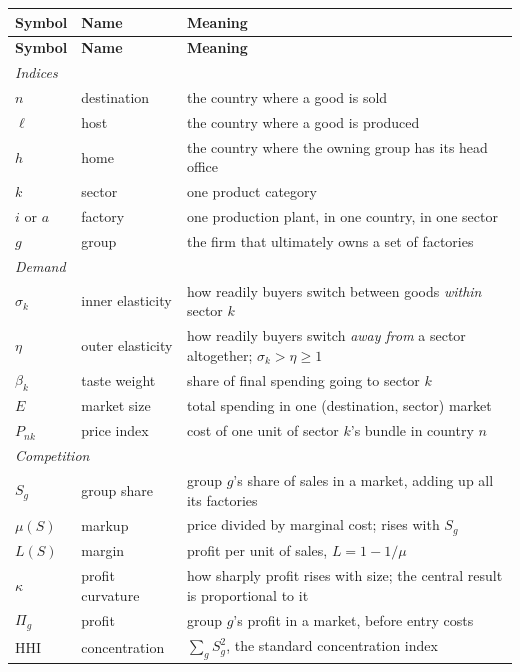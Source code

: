 \documentclass[11pt]{article}
\theoremstyle{plain}
\theoremstyle{remark}
\theoremstyle{definition}
\begin{document}
\begin{center}
\small
\begin{longtable}{ll p{8.4cm}}
\toprule
\textbf{Symbol} & \textbf{Name} & \textbf{Meaning}\\
\midrule
\endfirsthead
\toprule
\textbf{Symbol} & \textbf{Name} & \textbf{Meaning}\\
\midrule
\endhead
\multicolumn{3}{l}{\emph{Indices}}\\
$n$ & destination & the country where a good is sold\\
$\ell$ & host & the country where a good is produced\\
$h$ & home & the country where the owning group has its head office\\
$k$ & sector & one product category\\
$i$ or $a$ & factory & one production plant, in one country, in one sector\\
$g$ & group & the firm that ultimately owns a set of factories\\
\midrule
\multicolumn{3}{l}{\emph{Demand}}\\
$\sigma_k$ & inner elasticity & how readily buyers switch between goods \emph{within} sector $k$\\
$\eta$ & outer elasticity & how readily buyers switch \emph{away from} a sector altogether; $\sigma_k>\eta\ge1$\\
$\beta_k$ & taste weight & share of final spending going to sector $k$\\
$E$ & market size & total spending in one (destination, sector) market\\
$P_{nk}$ & price index & cost of one unit of sector $k$'s bundle in country $n$\\
\midrule
\multicolumn{3}{l}{\emph{Competition}}\\
$S_g$ & group share & group $g$'s share of sales in a market, adding up all its factories\\
$\mu(S)$ & markup & price divided by marginal cost; rises with $S_g$\\
$L(S)$ & margin & profit per unit of sales, $L=1-1/\mu$\\
$\kappa$ & profit curvature & how sharply profit rises with size; the central result is proportional to it\\
$\Pi_g$ & profit & group $g$'s profit in a market, before entry costs\\
$\mathrm{HHI}$ & concentration & $\sum_g S_g^2$, the standard concentration index\\
\midrule

\end{longtable}
\end{center}
\end{document}
